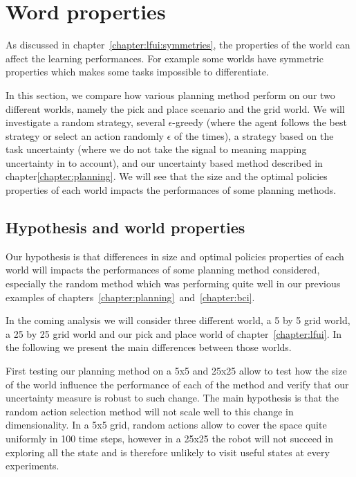 
\section{Word properties}
\label{chapter:limitations:wordlproperties}



As discussed in chapter~\ref{chapter:lfui:symmetries}, the properties of the world can affect the learning performances. For example some worlds have symmetric properties which makes some tasks impossible to differentiate. 

In this section, we compare how various planning method perform on our two different worlds, namely the pick and place scenario and the grid world. We will investigate a random strategy, several $\epsilon$-greedy (where the agent follows the best strategy or select an action randomly $\epsilon$ of the times), a strategy based on the task uncertainty (where we do not take the signal to meaning mapping uncertainty in to account), and our uncertainty based method described in chapter\ref{chapter:planning}. We will see that the size and the optimal policies properties of each world impacts the performances of some planning methods.

\subsection{Hypothesis and world properties}

Our hypothesis is that differences in size and optimal policies properties of each world will impacts the performances of some planning method considered, especially the random method which was performing quite well in our previous examples of chapters~\ref{chapter:planning}~and~\ref{chapter:bci}.

In the coming analysis we will consider three different world, a 5 by 5 grid world, a 25 by 25 grid world and our pick and place world of chapter~\ref{chapter:lfui}. In the following we present the main differences between those worlds.

First testing our planning method on a 5x5 and 25x25 allow to test how the size of the world influence the performance of each of the method and verify that our uncertainty measure is robust to such change. The main hypothesis is that the random action selection method will not scale well to this change in dimensionality. In a 5x5 grid, random actions allow to cover the space quite uniformly in 100 time steps, however in a 25x25 the robot will not succeed in exploring all the state and is therefore unlikely to visit useful states at every experiments.

